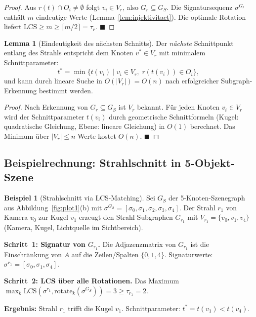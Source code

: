 ﻿\documentclass[a4paper,12pt]{article}
\theoremstyle{definition}
\newtheorem{beispiel}{Beispiel}[section]
\newtheorem{lemma}{Lemma}[section]
\begin{document}
\begin{proof}
  Aus $r(t) \cap O_i \neq \emptyset$ folgt $v_i \in V_r$, also
  $G_r \subseteq G_S$. Die Signatursequenz $\sigma^{G_r}$ enthält
  $m$ eindeutige Werte (Lemma~\ref{lem:injektivitaet}).
  Die optimale Rotation liefert $\mathrm{LCS} \geq m \geq
  \lceil m/2 \rceil = \tau_r$. \hfill$\blacksquare$
\end{proof}

\begin{lemma}[Eindeutigkeit des nächsten Schnitts]
  \label{lem:naechster_schnitt}
  Der \emph{nächste} Schnittpunkt entlang des Strahls entspricht
  dem Knoten $v^* \in V_r$ mit minimalem Schnittparameter:
  \[
    t^* = \min\bigl\{t(v_i) \;\big|\; v_i \in V_r,\;
    r(t(v_i)) \in O_i\bigr\},
  \]
  und kann durch lineare Suche in $O(|V_r|) = O(n)$ nach
  erfolgreicher Subgraph-Erkennung bestimmt werden.
\end{lemma}

\begin{proof}
  Nach Erkennung von $G_r \subseteq G_S$ ist $V_r$ bekannt.
  Für jeden Knoten $v_i \in V_r$ wird der Schnittparameter
  $t(v_i)$ durch geometrische Schnittformeln (Kugel: quadratische
  Gleichung, Ebene: lineare Gleichung) in $O(1)$ berechnet.
  Das Minimum über $|V_r| \leq n$ Werte kostet $O(n)$.
  \hfill$\blacksquare$
\end{proof}

\subsection{Beispielrechnung: Strahlschnitt in 5-Objekt-Szene}

\begin{beispiel}[Strahlschnitt via LCS-Matching]
  \label{bsp:schnitt}
  Sei $G_S$ der 5-Knoten-Szenegraph aus
  Abbildung~\ref{fig:plot1}(b) mit
  $\sigma^{G_S} = [\sigma_0, \sigma_1, \sigma_2, \sigma_3,
  \sigma_4]$.
  Der Strahl $r_1$ von Kamera $v_0$ zur Kugel $v_1$ erzeugt
  den Strahl-Subgraphen $G_{r_1}$ mit
  $V_{r_1} = \{v_0, v_1, v_4\}$ (Kamera, Kugel, Lichtquelle
  im Sichtbereich).

  \textbf{Schritt~1: Signatur von $G_{r_1}$.}
  Die Adjazenzmatrix von $G_{r_1}$ ist die Einschränkung von $A$
  auf die Zeilen/Spalten $\{0,1,4\}$. Signaturwerte:
  $\sigma^{r_1} = [\sigma_0, \sigma_1, \sigma_4]$.

  \textbf{Schritt~2: LCS über alle Rotationen.}
  Das Maximum $\max_k \mathrm{LCS}(\sigma^{r_1},
  \mathrm{rotate}_k(\sigma^{G_S})) = 3 \geq \tau_{r_1} = 2$.

  \textbf{Ergebnis:} Strahl $r_1$ trifft die Kugel $v_1$.
  Schnittparameter: $t^* = t(v_1) < t(v_4)$.
\end{beispiel}
\end{document}
